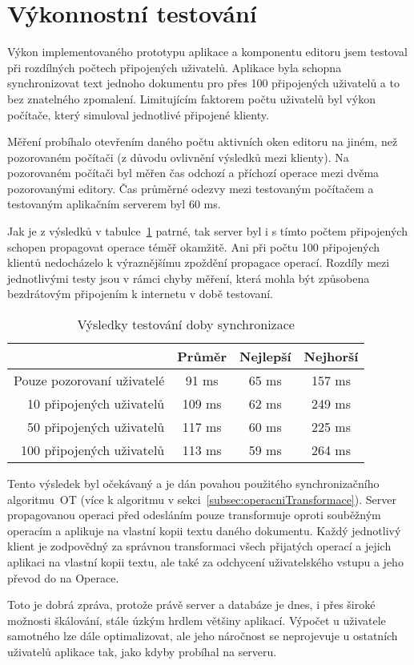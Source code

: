 
\section{Výkonnostní testování}\label{sec:systémovéTestování}

Výkon implementovaného prototypu aplikace a komponentu editoru jsem testoval při rozdílných počtech připojených uživatelů.
Aplikace byla schopna synchronizovat text jednoho dokumentu pro přes 100 připojených uživatelů a to bez znatelného zpomalení.
Limitujícím faktorem počtu uživatelů byl výkon počítače, který simuloval jednotlivé připojené klienty.

Měření probíhalo otevřením daného počtu aktivních oken editoru na jiném, než pozorovaném počítači (z důvodu ovlivnění výsledků mezi klienty).
Na pozorovaném počítači byl měřen čas odchozí a příchozí operace mezi dvěma pozorovanými editory.
Čas průměrné odezvy mezi testovaným počítačem a testovaným aplikačním serverem byl 60 ms.

Jak je z výsledků v tabulce~\ref{tab:vysledkyVýkonostníhoTestování} patrné, tak server byl i s tímto počtem připojených schopen propagovat operace téměř okamžitě.
Ani při počtu 100 připojených klientů nedocházelo k výraznějšímu zpoždění propagace operací.
Rozdíly mezi jednotlivými testy jsou v rámci chyby měření, která mohla být způsobena bezdrátovým připojením k internetu v době testovaní.

\begin{table}[ht!]
    \centering
    \caption{Výsledky testování doby synchronizace}
    \label{tab:vysledkyVýkonostníhoTestování}
    \begin{tabular}{r|ccc}
        & Průměr & Nejlepší & Nejhorší \\ \hline
        Pouze pozorovaní uživatelé & 91 ms & 65 ms & 157 ms \\
        10 připojených uživatelů & 109 ms & 62 ms & 249 ms \\
        50 připojených uživatelů & 117 ms & 60 ms & 225 ms \\
        100 připojených uživatelů & 113 ms & 59 ms & 264 ms
    \end{tabular}
\end{table}

Tento výsledek byl očekávaný a je dán povahou použitého synchronizačního algoritmu~\gls{OT} (více k algoritmu v sekci~\ref{subsec:operacniTransformace}).
Server propagovanou operaci před odesláním pouze transformuje oproti souběžným operacím a aplikuje na vlastní kopii textu daného dokumentu.
Každý jednotlivý klient je zodpovědný za správnou transformaci všech přijatých operací a jejich aplikaci na vlastní kopii textu, ale také za odchycení uživatelského vstupu a jeho převod do na Operace.

Toto je dobrá zpráva, protože právě server a databáze je dnes, i přes široké možnosti škálování, stále úzkým hrdlem většiny aplikací.
Výpočet u uživatele samotného lze dále optimalizovat, ale jeho náročnost se neprojevuje u ostatních uživatelů aplikace tak, jako kdyby probíhal na serveru.
